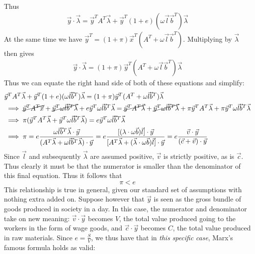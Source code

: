 \documentclass{article}
\theoremstyle{definition}
\theoremstyle{plain}
\theoremstyle{theorem}
\begin{document}
Thus 
\begin{align*}
	\vec{y} \cdot \vec{\lambda} = \vec{y}^TA^T\vec{\lambda} + \vec{y}^T(1+e)(\omega\vec{l}\vec{b}^T)\vec{\lambda}
\end{align*}
At the same time we have $\vec{y}^T = (1+\pi)\vec{x}^T(A^T + \omega\vec{l}\vec{b}^T)$. Multiplying by $\vec{\lambda}$ then gives
\begin{align*}
	\vec{y}\cdot \vec{\lambda} = (1+\pi)\vec{y}^T(A^T + \omega\vec{l}\vec{b}^T)\vec{\lambda}
\end{align*}
Thus we can equate the right hand side of both of these equations and simplify:
\begin{align*}
	& \vec{y}^TA^T\vec{\lambda} + \vec{y}^T(1+e)(\omega\vec{l}\vec{b}^T)\vec{\lambda} = (1+\pi)\vec{y}^T(A^T + \omega\vec{l}\vec{b}^T)\vec{\lambda} \\
	&\implies \cancel{\vec{y}^TA^T\vec{x}} + \cancel{\vec{y}^T\omega\vec{l}\vec{b}^T\vec{\lambda}} + e\vec{y}^T\omega\vec{l}\vec{b}^T\vec{\lambda} = \cancel{\vec{y}^TA^T\vec{\lambda}} + \cancel{\vec{y}^T\omega\vec{l}\vec{b}^T\vec{\lambda}} + \pi\vec{y}^TA^T\vec{\lambda} + \pi\vec{y}^T\omega\vec{l}\vec{b}^T\vec{\lambda} \\
	&\implies \pi(\vec{y}^TA^T\vec{\lambda}+\vec{y}^T\omega\vec{l}\vec{b}^T\vec{\lambda}) = e\vec{y}^T\omega\vec{l}\vec{b}^T\vec{\lambda} \\
	&\implies \pi = e\frac{\omega\vec{l}\vec{b}^T\vec{\lambda} \cdot \vec{y}}{(A^T\vec{\lambda} + \omega\vec{l}\vec{b}^T\vec{\lambda})\cdot\vec{y}} = e\frac{[(\lambda \cdot \omega\vec{b})\vec{l}]\cdot\vec{y}}{[A^T\vec{\lambda} + (\vec{\lambda}\cdot \omega\vec{b})\vec{l}]\cdot\vec{y}} = e\frac{\vec{v} \cdot\vec{y}}{(\vec{c} + \vec{v})\cdot \vec{y}}
\end{align*}
Since $\vec{l}$ and subsequently $\vec{\lambda}$ are assumed positive, $\vec{v}$ is strictly positive, as is $\vec{c}$. Thus clearly it must be that the numerator is smaller than the denominator of this final equation. Thus it follows that
\[ \pi < e \]
This relationship is true in general, given our standard set of assumptions with nothing extra added on. Suppose however that $\vec{y}$ is seen as the gross bundle of goods produced in society in a day. In this case, the numerator and denominator take on new meaning: $\vec{v} \cdot \vec{y}$ becomes $V$, the total value produced going to the workers in the form of wage goods, and $\vec{c} \cdot \vec{y}$ becomes $C$, the total value produced in raw materials. Since $e = \frac{S}{V}$, we thus have that in \textit{this specific case}, Marx's famous formula holds as valid:
\end{document}
